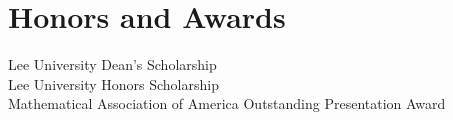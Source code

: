 \section{\sc Honors and Awards}
Lee University Dean's Scholarship \\
Lee University Honors Scholarship \\
Mathematical Association of America Outstanding Presentation Award 
\endinput